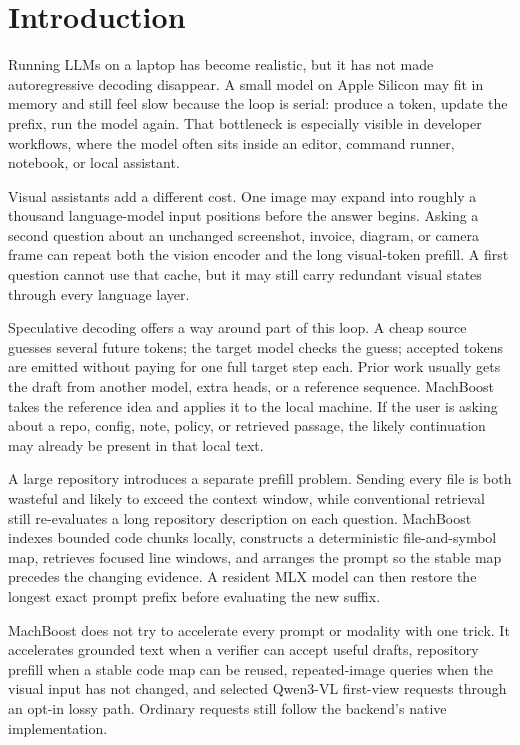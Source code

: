 \documentclass[11pt]{article}
\begin{document}
\section{Introduction}
Running LLMs on a laptop has become realistic, but it has not made autoregressive decoding disappear. A small model on Apple Silicon may fit in memory and still feel slow because the loop is serial: produce a token, update the prefix, run the model again. That bottleneck is especially visible in developer workflows, where the model often sits inside an editor, command runner, notebook, or local assistant.

Visual assistants add a different cost. One image may expand into roughly a thousand language-model input positions before the answer begins. Asking a second question about an unchanged screenshot, invoice, diagram, or camera frame can repeat both the vision encoder and the long visual-token prefill. A first question cannot use that cache, but it may still carry redundant visual states through every language layer.

Speculative decoding offers a way around part of this loop. A cheap source guesses several future tokens; the target model checks the guess; accepted tokens are emitted without paying for one full target step each. Prior work usually gets the draft from another model, extra heads, or a reference sequence. MachBoost takes the reference idea and applies it to the local machine. If the user is asking about a repo, config, note, policy, or retrieved passage, the likely continuation may already be present in that local text.

A large repository introduces a separate prefill problem. Sending every file is
both wasteful and likely to exceed the context window, while conventional
retrieval still re-evaluates a long repository description on each question.
MachBoost indexes bounded code chunks locally, constructs a deterministic
file-and-symbol map, retrieves focused line windows, and arranges the prompt so
the stable map precedes the changing evidence. A resident MLX model can then
restore the longest exact prompt prefix before evaluating the new suffix.

MachBoost does not try to accelerate every prompt or modality with one trick. It accelerates grounded text when a verifier can accept useful drafts, repository prefill when a stable code map can be reused, repeated-image queries when the visual input has not changed, and selected Qwen3-VL first-view requests through an opt-in lossy path. Ordinary requests still follow the backend's native implementation.
\end{document}
